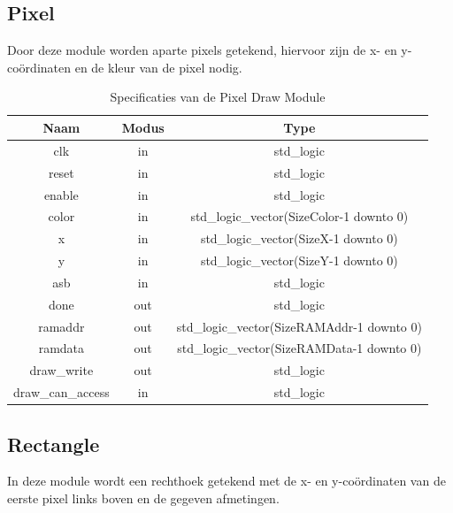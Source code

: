 \documentclass{scrreprt} %
\begin{document}
\subsection {Pixel}
Door deze module worden aparte pixels getekend, hiervoor zijn de x- en y-coördinaten en de kleur van de pixel nodig.

\begin{table}[H]
\centering
\caption{Specificaties van de Pixel Draw Module}
\label{tab:spec-pixel-draw}
\begin{tabular}{c c c}
	\hline\hline
 	Naam & Modus & Type\\
 	\hline	
	clk & in & std\_logic \\
	reset & in & std\_logic \\
	enable& in & std\_logic \\
	color & in & std\_logic\_vector(SizeColor-1 downto 0) \\
	x & in & std\_logic\_vector(SizeX-1 downto 0) \\
	y & in & std\_logic\_vector(SizeY-1 downto 0) \\
	asb & in & std\_logic \\
	done & out & std\_logic \\
	ramaddr &out & std\_logic\_vector(SizeRAMAddr-1 downto 0) \\
	ramdata &out & std\_logic\_vector(SizeRAMData-1 downto 0) \\
	draw\_write &out & std\_logic \\
	draw\_can\_access & in & std\_logic \\
  	\hline
\end{tabular}
\end{table}

\subsection {Rectangle}
In deze module wordt een rechthoek getekend met de x- en y-coördinaten van de eerste pixel links boven en de gegeven afmetingen.
\end{document}
